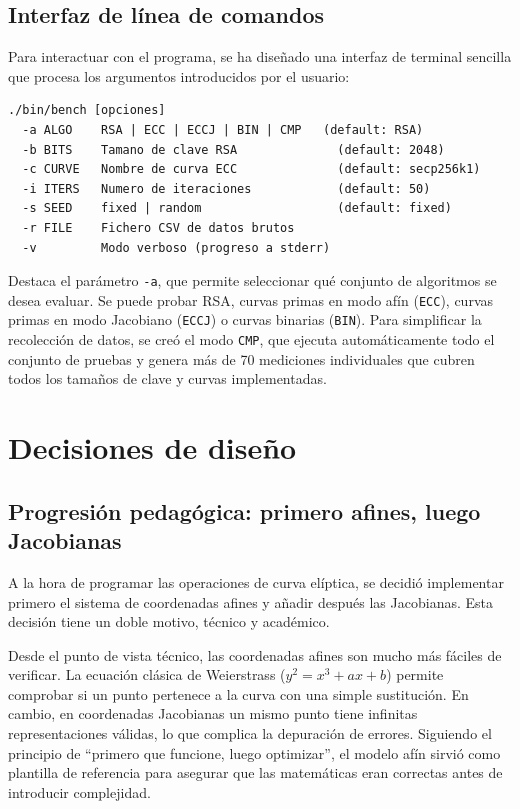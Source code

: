 \subsection{Interfaz de línea de comandos}
\label{subsec:impl-cli}

Para interactuar con el programa, se ha diseñado una interfaz de terminal sencilla que procesa los argumentos introducidos por el usuario:

\begin{verbatim}
./bin/bench [opciones]
  -a ALGO    RSA | ECC | ECCJ | BIN | CMP   (default: RSA)
  -b BITS    Tamano de clave RSA              (default: 2048)
  -c CURVE   Nombre de curva ECC              (default: secp256k1)
  -i ITERS   Numero de iteraciones            (default: 50)
  -s SEED    fixed | random                   (default: fixed)
  -r FILE    Fichero CSV de datos brutos
  -v         Modo verboso (progreso a stderr)
\end{verbatim}

Destaca el parámetro \texttt{-a}, que permite seleccionar qué conjunto de algoritmos se desea evaluar. Se puede probar RSA, curvas primas en modo afín (\texttt{ECC}), curvas primas en modo 
Jacobiano (\texttt{ECCJ}) o curvas binarias (\texttt{BIN}). Para simplificar la recolección de datos, se creó el modo \texttt{CMP}, que ejecuta automáticamente todo el conjunto de pruebas y 
genera más de 70 mediciones individuales que cubren todos los tamaños de clave y curvas implementadas.


\section{Decisiones de diseño}
\label{sec:impl-decisiones}

\subsection{Progresión pedagógica: primero afines, luego Jacobianas}
\label{subsec:impl-progresion}

A la hora de programar las operaciones de curva elíptica, se decidió implementar primero el sistema de coordenadas afines y añadir después las Jacobianas. Esta decisión tiene un doble motivo, 
técnico y académico.

Desde el punto de vista técnico, las coordenadas afines son mucho más fáciles de verificar. La ecuación clásica de Weierstrass ($y^2 = x^3 + ax + b$) permite comprobar si un punto pertenece a la 
curva con una simple sustitución. En cambio, en coordenadas Jacobianas un mismo punto tiene infinitas representaciones válidas, lo que complica la depuración de errores. Siguiendo el principio 
de ``primero que funcione, luego optimizar'', el modelo afín sirvió como plantilla de referencia para asegurar que las matemáticas eran correctas antes de introducir complejidad.


